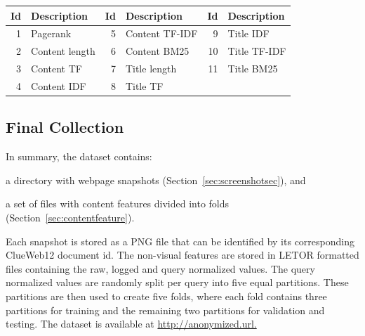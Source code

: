 \begin{table}[h]
\centering
{}  \label{tab:setdescription} 
\begin{tabular}{rlrlrl}
\toprule
Id & Description & Id & Description & Id & Description    \\ 
\midrule
1  & Pagerank  & 5  & Content TF-IDF  & 9  & Title IDF   \\
2  & Content length & 6  & Content BM25   & 10 & Title TF-IDF   \\
3  & Content TF  & 7  & Title length & 11 & Title BM25  \\
4  & Content IDF & 8  & Title TF  & & \\
\bottomrule
\end{tabular}
\end{table}

\subsection{Final Collection}\label{sec:finalcollection}
In summary, the \datasetname{} dataset contains:
\begin{inparaenum}[(i)]
\item a directory with webpage snapshots (Section~\ref{sec:screenshotsec}), and
\item a set of files with content features divided into folds (Section~\ref{sec:contentfeature}).
\end{inparaenum}
Each snapshot is stored as a PNG file that can be identified by its corresponding ClueWeb12 document id. 
The non-visual features are stored in LETOR formatted files containing the raw, logged and query normalized values.
The query normalized values are randomly split per query into five equal partitions.
These partitions are then used to create five folds, where each fold contains three partitions for training and the remaining two partitions for validation and testing.
The \datasetname{} dataset is available at \url{http://anonymized.url.}



